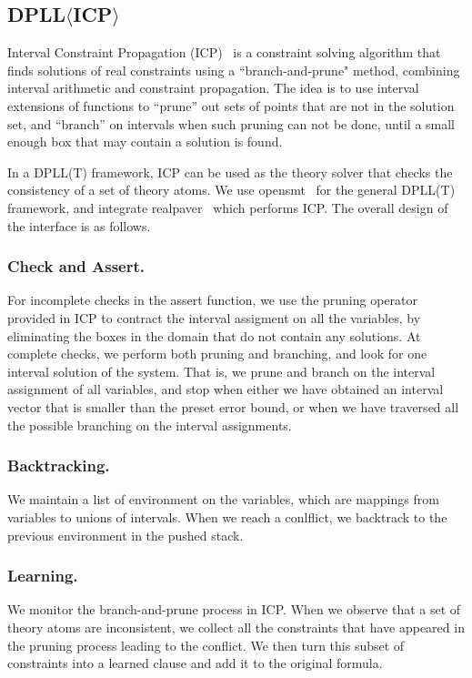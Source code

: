 \documentclass[envcountsect]{llncs}
\begin{document}
\subsection{DPLL$\langle$ICP$\rangle$}

Interval Constraint Propagation (ICP)~\cite{handbookICP} is a constraint solving
algorithm that finds
solutions of real constraints using a ``branch-and-prune" method, combining
interval arithmetic and constraint propagation. The idea is to use interval
extensions of functions to ``prune'' out sets of points that are not in the
solution set, and ``branch'' on intervals when such pruning can not be done,
until a small enough box that may contain a solution is found. 

In a DPLL(T) framework, ICP can be used as the theory solver that checks the
consistency of a set of theory atoms. We use opensmt~\cite{} for the general
DPLL(T) framework, and integrate realpaver~\cite{} which performs ICP. The
overall design of the interface is as follows. 
\subsubsection{Check and Assert.} For incomplete checks in the assert function,
we use the pruning operator provided in ICP to contract the interval assigment
on all the variables, by eliminating the boxes in the domain that do not contain
any solutions. At complete checks, we perform both pruning and branching, and
look for one interval solution of the system. That is, we prune and branch on
the interval assignment of all variables, and stop when either we have obtained
an interval vector that is smaller than the preset error bound, or when we have
traversed all the possible branching on the interval assignments. 
\subsubsection{Backtracking.} We maintain a list of environment on the variables,
which are mappings from variables to unions of intervals. When we reach a
conlflict, we backtrack to the previous environment in the pushed stack. 
\subsubsection{Learning.} We monitor the branch-and-prune process in ICP.
When we observe that a set of theory atoms are inconsistent, we collect all the
constraints that have appeared in the pruning process leading to the conflict.
We then turn this subset of constraints into a learned clause and add it to the
original formula. 
\end{document}
